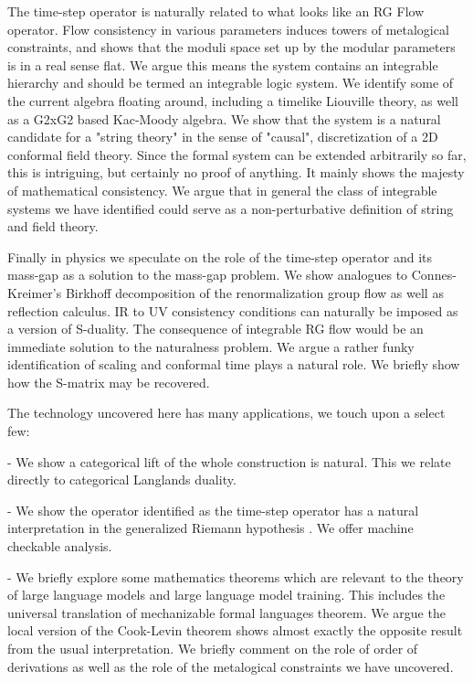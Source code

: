 The time-step operator is naturally related to what looks like an RG Flow operator. Flow consistency in various parameters induces towers of metalogical constraints, and shows that the moduli space set up by the modular parameters is in a real sense flat. We argue this means the system contains an integrable hierarchy and should be termed an integrable logic system. We identify some of the current algebra floating around, including a timelike Liouville theory, as well as a G2xG2 based Kac-Moody algebra. We show that the system is a natural candidate for a "string theory" in the sense of "causal", discretization of a 2D conformal field theory. Since the formal system can be extended arbitrarily so far, this is intriguing, but certainly no proof of anything. It mainly shows the majesty of mathematical consistency. We argue that in general the class of integrable systems we have identified could serve as a non-perturbative definition of string and field theory.  

Finally in physics we speculate on the role of the time-step operator and its mass-gap as a solution to the mass-gap problem. We show analogues to Connes-Kreimer's Birkhoff decomposition \cite{connes_kreimer2000} of the renormalization group flow as well as reflection calculus. IR to UV consistency conditions can naturally be imposed as a version of S-duality. The consequence of integrable RG flow would be an immediate solution to the naturalness problem. We argue a rather funky identification of scaling and conformal time plays a natural role. We briefly show how the S-matrix may be recovered. 

The technology uncovered here has many applications, we touch upon a select few:

- We show a categorical lift of the whole construction is natural. This we relate directly to categorical Langlands duality.

- We show the operator identified as the time-step operator has a natural interpretation in the generalized Riemann hypothesis \cite{riemann1859}. We offer machine checkable analysis. 

- We briefly explore some mathematics theorems which are relevant to the theory of large language models and large language model training. This includes the universal translation of mechanizable formal languages theorem. We argue the local version of the Cook-Levin theorem \cite{cook1971} shows almost exactly the opposite result from the usual interpretation. We briefly comment on the role of order of derivations as well as the role of the metalogical constraints we have uncovered. 

